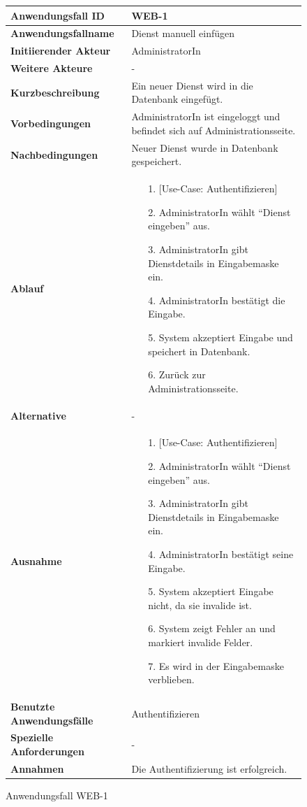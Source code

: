 \begin{figure}[h]
	\centering
	\begin{tabularx}{\textwidth}{ X | X }
		\textbf{Anwendungsfall ID} & WEB-1 \\ \hline
		\textbf{Anwendungsfallname} & Dienst manuell einfügen \\ \hline
		\textbf{Initiierender Akteur} & AdministratorIn \\ \hline
		\textbf{Weitere Akteure} & - \\ \hline
		\textbf{Kurzbeschreibung} & Ein neuer Dienst wird in die Datenbank eingefügt. \\ \hline
		\textbf{Vorbedingungen} & AdministratorIn ist eingeloggt und befindet sich auf Administrationsseite. \\ \hline
		\textbf{Nachbedingungen} & Neuer Dienst wurde in Datenbank gespeichert. \\ \hline
		\textbf{Ablauf} &
		\begin{enumerate}
			\item [1.] [Use-Case: Authentifizieren]
			\item [2.] AdministratorIn wählt ``Dienst eingeben'' aus.
			\item [3.] AdministratorIn gibt Dienstdetails in Eingabemaske ein.
			\item [4.] AdministratorIn bestätigt die Eingabe.
			\item [5.] System akzeptiert Eingabe und speichert in Datenbank.
			\item [6.] Zurück zur Administrationsseite.
		\end{enumerate} \\ \hline
		\textbf{Alternative} & - \\ \hline
		\textbf{Ausnahme} &
		\begin{enumerate}
			\item [1.] [Use-Case: Authentifizieren]
			\item [2.] AdministratorIn wählt ``Dienst eingeben'' aus.
			\item [3.] AdministratorIn gibt Dienstdetails in Eingabemaske ein.
			\item [4.] AdministratorIn bestätigt seine Eingabe.
			\item [5.] System akzeptiert Eingabe nicht, da sie invalide ist.
			\item [6.] System zeigt Fehler an und markiert invalide Felder.
			\item [7.] Es wird in der Eingabemaske verblieben.
		\end{enumerate} \\ \hline
		\textbf{Benutzte Anwendungsfälle} & Authentifizieren \\ \hline
		\textbf{Spezielle Anforderungen} & - \\ \hline
		\textbf{Annahmen} & Die Authentifizierung ist erfolgreich.
	\end{tabularx}
	\caption{Anwendungsfall WEB-1}
	\label{fig:anwendungsfall-server-tabelle-web-1}
\end{figure}

